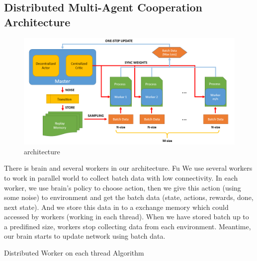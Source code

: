 \documentclass[11pt,twocolumn]{jarticle} %
\begin{document}
\subsection{Distributed Multi-Agent Cooperation Architecture}
\begin{figure}[t]
 \begin{center}
  \includegraphics[width=12cm]{imgs/architecture.PNG}
  \caption{architecture}
  \label{fig:architecture}
 \end{center}
\end{figure}

There is brain and several workers in our architecture. Fu We use several workers to work in parallel world to collect batch data with low connectivity. In each worker,  we use brain's policy to choose action, then we give this action (using some noise) to environment and get the batch data (state, actions, rewards, done, next state). And we store this data in to a exchange memory which could accessed by workers (working in each thread). When we have stored batch up to a predifined size, workers stop collecting data from each environment. Meantime, our brain starts to update network using batch data.

\begin{algorithm*}
\caption{Distributed Worker on each thread Algorithm}
\begin{algorithmic}
  \EndIf
\EndFor
\end{algorithmic}
\end{algorithm*}
\end{document}

